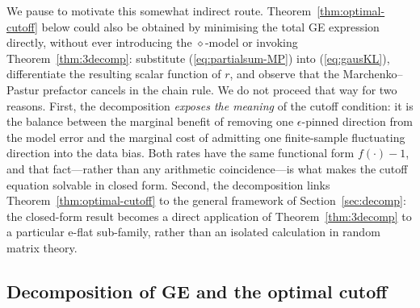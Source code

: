 \documentclass[11pt,a4paper]{article}
\theoremstyle{definition}
\theoremstyle{remark}
\begin{document}
We pause to motivate this somewhat indirect route.
Theorem~\ref{thm:optimal-cutoff} below could also be obtained by
minimising the total GE expression directly, without ever
introducing the $\diamond$-model or invoking
Theorem~\ref{thm:3decomp}: substitute (\ref{eq:partialsum-MP})
into (\ref{eq:gausKL}), differentiate the resulting scalar
function of $r$, and observe that the Marchenko--Pastur prefactor
cancels in the chain rule. We do not proceed that way for two
reasons. First, the decomposition \emph{exposes the meaning} of
the cutoff condition: it is the balance between the marginal
benefit of removing one $\epsilon$-pinned direction from the
model error and the marginal cost of admitting one
finite-sample fluctuating direction into the data bias. Both
rates have the same functional form $f(\cdot) - 1$, and that
fact---rather than any arithmetic coincidence---is what makes
the cutoff equation solvable in closed form. Second, the
decomposition links Theorem~\ref{thm:optimal-cutoff} to the
general framework of Section~\ref{sec:decomp}: the closed-form
result becomes a direct application of
Theorem~\ref{thm:3decomp} to a particular e-flat sub-family,
rather than an isolated calculation in random matrix theory.

\subsection{Decomposition of GE and the optimal cutoff}
\label{sec:epca-decomp}
\end{document}
